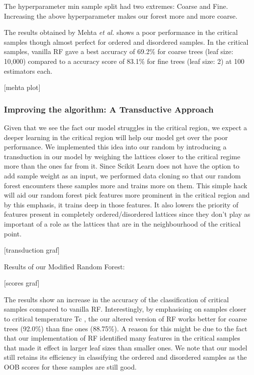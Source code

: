 The hyperparameter min sample split had two extremes: Coarse and Fine. Increasing the above hyperparameter makes our forest more and more coarse.

The results obtained by Mehta \emph{et al.} \cite{2019} shows a poor performance in the critical samples though almost perfect for ordered and disordered samples. In the critical samples, vanilla RF gave a best accuracy of 69.2\% for coarse trees (leaf size: 10,000) compared to a accuracy score of 83.1\% for fine trees (leaf size: 2) at 100 estimators each.

[mehta plot]

\subsubsection{Improving the algorithm: A Transductive Approach}
Given that we see the fact our model struggles in the critical region, we expect a deeper learning in the critical region will help our model get over the poor performance. We implemented this idea into our random by introducing a transduction in our model by weighing the lattices closer to the critical regime more than the ones far from it. Since Scikit Learn does not have the option to add sample weight as an input, we performed data cloning so that our random forest encounters these samples more and trains more on them. This simple hack will aid our random forest pick features more prominent in the critical region and by this emphasis, it trains deep in those features. It also lowers the priority of features present in completely ordered/disordered lattices since they don’t play as important of a role as the lattices that are in the neighbourhood of the critical point.

[transduction graf]

Results of our Modified Random Forest:

[scores graf]

The results show an increase in the accuracy of the classification of critical samples compared to vanilla RF. Interestingly, by emphasising on samples closer to critical temperature Tc , the our altered version of RF works better
for coarse trees (92.0\%) than fine ones (88.75\%). A reason for this might be due to the fact that our implementation of RF identified many features in the critical samples that made it effect in larger leaf sizes than smaller ones. We note that our model still retains its efficiency in classifying the ordered and disordered samples as the OOB scores for these samples are still good.
